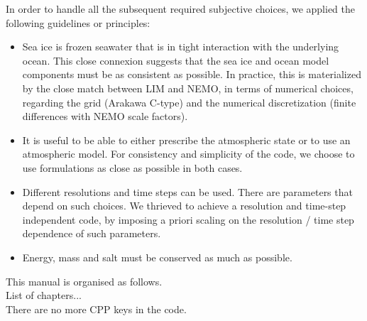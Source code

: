 
In order to handle all the subsequent required subjective choices, we applied the following guidelines or principles:
\begin{itemize}
\item Sea ice is frozen seawater that is in tight interaction with the underlying ocean. This close connexion suggests that the sea ice and ocean model components must be as consistent as possible. In practice, this is materialized by the close match between LIM and NEMO, in terms of numerical choices, regarding the grid (Arakawa C-type) and the numerical discretization (finite differences with NEMO scale factors).
\item It is useful to be able to either prescribe the atmospheric state or to use an atmospheric model. For consistency and simplicity of the code, we choose to use formulations as close as possible in both cases.
\item Different resolutions and time steps can be used. There are parameters that depend on such choices. We thrieved to achieve a resolution and time-step independent code, by imposing a priori scaling on the resolution / time step dependence of such parameters.
\item Energy, mass and salt must be conserved as much as possible.
\end{itemize}

This manual is organised as follows. \\

List of chapters... \\

There are no more CPP keys in the code. \\

